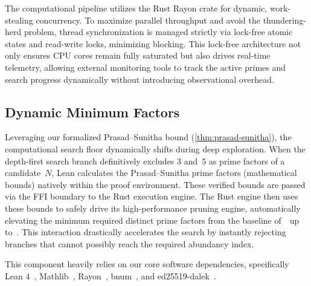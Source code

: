 The computational pipeline utilizes the Rust Rayon crate for dynamic,
work-stealing concurrency.  To maximize parallel throughput and avoid
the thundering-herd problem, thread synchronization is managed strictly
via lock-free atomic states and read-write locks, minimizing blocking.
This lock-free architecture not only ensures CPU cores remain fully
saturated but also drives real-time telemetry, allowing external
monitoring tools to track the active primes and search progress
dynamically without introducing observational overhead.

\subsection{Dynamic Minimum Factors}
\label{subsec:dynamic_minimum_factors}

Leveraging our formalized Prasad--Sunitha bound
(\cref{thm:prasad-sunitha}), the computational search floor dynamically
shifts during deep exploration.  When the depth-first search branch
definitively excludes 3 and~5 as prime factors of a candidate~$N$, Lean
calculates the Prasad--Sunitha prime factors (mathematical bounds) natively
within the proof environment. These verified bounds are passed via the FFI
boundary to the Rust execution engine. The Rust engine then uses these bounds
to safely drive its high-performance pruning engine, automatically elevating
the minimum required distinct prime factors from the baseline of~\TelemetryHagisBaselineMinPrimeFactors\
up to~\TelemetryPrasadSunithaBound. This interaction drastically accelerates the search by
instantly rejecting branches that cannot possibly reach the required abundancy index.


This component heavily relies on our core software dependencies, specifically Lean 4~\cite{moura2021}, Mathlib~\cite{mathlib2020}, Rayon~\cite{rayon2024}, bnum~\cite{bnum2024}, and ed25519-dalek~\cite{ed25519dalek2024}.
